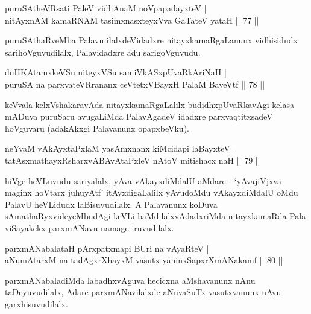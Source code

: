 \begin{shl}
puruSAtheVR\s sati PaleV vidhAnaM noVpapadayxteV |\\
nitAyxnAM kamaRNAM tasimxnasxteyxVva GaTateV yataH \hfill || 77 ||
\end{shl}

\begin{artha}
puruSAthaRveMba Palavu ilalxdeVidadxre nitayxkamaRgaLanunx vidhisidudx sarihoVguvudilalx, Palavidadxre adu sarigoVguvudu.
\end{artha}


\begin{shl}
duHKAtamxkeVSu niteyxVSu samiVkASxpUvaRkAriNaH |\\
puruSA na parxvateVRrananx ceVtetxVBayxH PalaM BaveVtf \hfill || 78 ||
\end{shl}

\begin{artha}
keVvala kelxVshakaravAda  nitayxkamaRgaLalilx budidhxpUvaRkavAgi kelasa mADuva puruSaru avugaLiMda PalavAgadeV idadxre parxvaqtitxsadeV hoVguvaru (adakAkxgi Palavanunx opapxbeVku).
\end{artha}


\begin{shl}
neYvaM vAkAyxtaPxlaM yasAmxnanx kiMcidapi laBayxteV |\\
tatAsxmathayxRsharxvABAvAtaPxleV nAtoV mitishacx naH \hfill || 79 ||
\end{shl}

\begin{artha}
hiVge heVLuvudu sariyalalx, yAva vAkayxdiMdalU aMdare - `yAvajiVjxva maginx hoVtarx juhuyAtf' itAyxdigaLalilx yAvudoMdu vAkayxdiMdalU oMdu PalavU heVLidudx laBisuvudilalx. A Palavanunx koDuva sAmathaRyxvideyeMbudAgi keVLi baMdilalxvAdadxriMda nitayxkamaRda Pala viSayakekx parxmANavu namage iruvudilalx.
\end{artha}

\begin{shl}
parxmANabalataH pArxpatxmapi BUri na vAyaRteV |\\
aNumAtarxM na tadAgxrXhayxM vasutx yaninxSapxrXmANakamf \hfill || 80 ||
\end{shl}

\begin{artha}
parxmANabaladiMda labadhxvAguva hecicxna aMshavanunx nAnu taDeyuvudilalx, Adare parxmANavilalxde aNuvaSuTx vasutxvanunx nAvu garxhisuvudilalx.
\end{artha}


